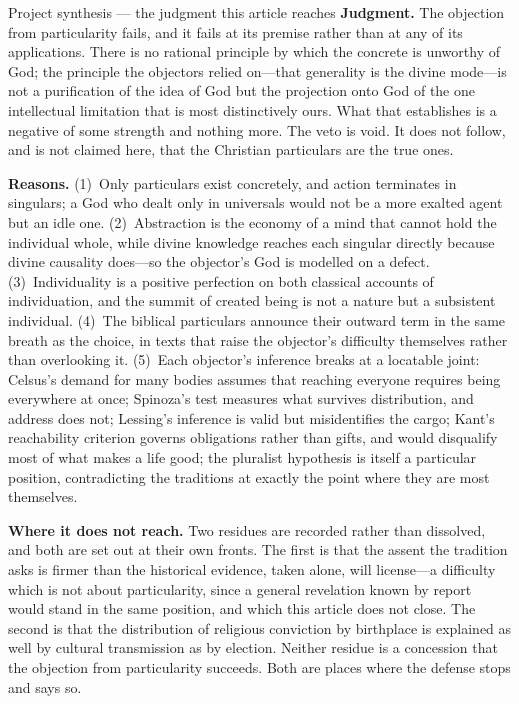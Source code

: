 \begin{studybox}{Project synthesis --- the judgment this article reaches}
\textbf{Judgment.} The objection from particularity fails, and it fails at its premise rather than at any of its applications. There is no rational principle by which the concrete is unworthy of God; the principle the objectors relied on---that generality is the divine mode---is not a purification of the idea of God but the projection onto God of the one intellectual limitation that is most distinctively ours. What that establishes is a negative of some strength and nothing more. The veto is void. It does not follow, and is not claimed here, that the Christian particulars are the true ones.

\textbf{Reasons.} (1)~Only particulars exist concretely, and action terminates in singulars; a God who dealt only in universals would not be a more exalted agent but an idle one. (2)~Abstraction is the economy of a mind that cannot hold the individual whole, while divine knowledge reaches each singular directly because divine causality does---so the objector's God is modelled on a defect. (3)~Individuality is a positive perfection on both classical accounts of individuation, and the summit of created being is not a nature but a subsistent individual. (4)~The biblical particulars announce their outward term in the same breath as the choice, in texts that raise the objector's difficulty themselves rather than overlooking it. (5)~Each objector's inference breaks at a locatable joint: Celsus's demand for many bodies assumes that reaching everyone requires being everywhere at once; Spinoza's test measures what survives distribution, and address does not; Lessing's inference is valid but misidentifies the cargo; Kant's reachability criterion governs obligations rather than gifts, and would disqualify most of what makes a life good; the pluralist hypothesis is itself a particular position, contradicting the traditions at exactly the point where they are most themselves.

\textbf{Where it does not reach.} Two residues are recorded rather than dissolved, and both are set out at their own fronts. The first is that the assent the tradition asks is firmer than the historical evidence, taken alone, will license---a difficulty which is not about particularity, since a general revelation known by report would stand in the same position, and which this article does not close. The second is that the distribution of religious conviction by birthplace is explained as well by cultural transmission as by election. Neither residue is a concession that the objection from particularity succeeds. Both are places where the defense stops and says so.


\end{studybox}

